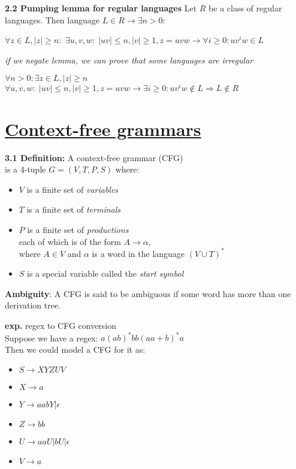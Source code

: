 \documentclass{article}
\begin{document}
\begin{multicols}{2}
\textbf{2.2 Pumping lemma for regular languages}
Let $R$ be a class of regular languages.
Then language $L \in R \rightarrow \exists n > 0:$
\begin{center}
    \begin{math}
        \forall z \in L, |z| \geq n:
    \end{math}
    \begin{math}
        \exists u,v,w:\; |uv| \leq n, |v| \geq 1, z = uvw \rightarrow \forall i \geq 0: uv^iw \in L
    \end{math}
\end{center}
\textit{if we negate lemma, we can prove that some languages are irregular}
\begin{center}
    \begin{math}
        \forall n > 0:  \exists z \in L, |z| \geq n
    \end{math}
    \begin{math}
        \forall u,v,w:\; |uv| \leq n, |v| \geq 1, z = uvw \rightarrow \exists i \geq 0: uv^iw \notin L \Rightarrow L \notin R
    \end{math}
\end{center}

\section{\underline{Context-free grammars}}

\textbf{3.1 Definition:} A context-free grammar (CFG) \\
is a 4-tuple $G = (V, T, P, S)$ where:
\begin{itemize}
    \setlength\itemsep{-0.4em}
    \item $V$ is a finite set of \textit{variables}
    \item $T$ is a finite set of \textit{terminals}
    \item $P$ is a finite set of \textit{productions}\\
        each of which is of the form $A \rightarrow \alpha$,\\
        where $A \in V$ and $\alpha$ is a word in the language $(V \cup T)^*$
    \item $S$ is a special variable called the \textit{start symbol}
\end{itemize}
\textbf{Ambiguity}:
A CFG is said to be ambiguous if some word has more than one derivation tree.

\textbf{exp.} regex to CFG conversion\\
Suppose we have a regex: $a(ab)^*bb(aa+b)^*a$\\
Then we could model a CFG for it as:
\begin{itemize}
    \setlength\itemsep{-0.5em}
    \item $S \rightarrow XYZUV$
    \item $X \rightarrow a$
    \item $Y \rightarrow aabY | \epsilon$
    \item $Z \rightarrow bb$
    \item $U \rightarrow aaU|bU|\epsilon$
    \item $V \rightarrow a$
\end{itemize}


\end{multicols}
\end{document}

